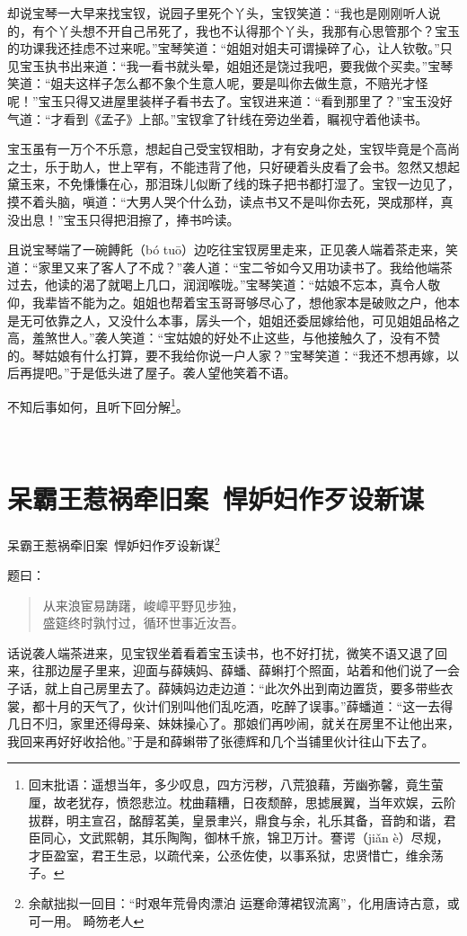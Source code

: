 \documentclass[12pt,oneside]{book}
\newenvironment{shici}{%
\begin{verse}%
\centering\large\hspace{12pt}}%
{\end{verse}}
\begin{document}
却说宝琴一大早来找宝钗，说园子里死个丫头，宝钗笑道：“我也是刚刚听人说的，有个丫头想不开自己吊死了，我也不认得那个丫头，我那有心思管那个？宝玉的功课我还挂虑不过来呢。”宝琴笑道：“姐姐对姐夫可谓操碎了心，让人钦敬。”只见宝玉执书出来道：“我一看书就头晕，姐姐还是饶过我吧，要我做个买卖。”宝琴笑道：“姐夫这样子怎么都不象个生意人呢，要是叫你去做生意，不赔光才怪呢！”宝玉只得又进屋里装样子看书去了。宝钗进来道：“看到那里了？”宝玉没好气道：“才看到《孟子》上部。”宝钗拿了针线在旁边坐着，瞩视守着他读书。

宝玉虽有一万个不乐意，想起自己受宝钗相助，才有安身之处，宝钗毕竟是个高尚之士，乐于助人，世上罕有，不能违背了他，只好硬着头皮看了会书。忽然又想起黛玉来，不免慊慊在心，那泪珠儿似断了线的珠子把书都打湿了。宝钗一边见了，摸不着头脑，嗔道：“大男人哭个什么劲，读点书又不是叫你去死，哭成那样，真没出息！”宝玉只得把泪擦了，捧书吟读。

且说宝琴端了一碗餺飥（bó tuō）边吃往宝钗房里走来，正见袭人端着茶走来，笑道：“家里又来了客人了不成？”袭人道：“宝二爷如今又用功读书了。我给他端茶过去，他读的渴了就喝上几口，润润喉咙。”宝琴笑道：“姑娘不忘本，真令人敬仰，我辈皆不能为之。姐姐也帮着宝玉哥哥够尽心了，想他家本是破败之户，他本是无可依靠之人，又没什么本事，孱头一个，姐姐还委屈嫁给他，可见姐姐品格之高，羞煞世人。”袭人笑道：“宝姑娘的好处不止这些，与他接触久了，没有不赞的。琴姑娘有什么打算，要不我给你说一户人家？”宝琴笑道：“我还不想再嫁，以后再提吧。”于是低头进了屋子。袭人望他笑着不语。

不知后事如何，且听下回分解\footnote{回末批语：遥想当年，多少叹息，四方污秽，八荒狼藉，芳幽弥馨，竟生萤厘，故老犹存，愤怨悲泣。枕曲藉糟，日夜颓醉，思摅展翼，当年欢娱，云阶拔群，明主宣召，酩醇茗美，皇景聿兴，鼎食与余，礼乐其备，音韵和谐，君臣同心，文武熙朝，其乐陶陶，御林千旅，锦卫万计。謇谔（jiǎn è）尽规，才臣盈室，君王生忌，以疏代亲，公丞佐使，以事系狱，忠贤惜亡，维余荡子。}。

 
\chapter{呆霸王惹祸牵旧案~悍妒妇作歹设新谋}
呆霸王惹祸牵旧案~悍妒妇作歹设新谋\footnote{余献拙拟一回目：“时艰年荒骨肉漂泊 运蹇命薄裙钗流离”，化用唐诗古意，或可一用。 畸笏老人}

题曰：

\begin{shici}
从来浪宦易踌躇，峻嶂平野见步独，\\
盛筵终时孰忖过，循环世事近汝吾。
\end{shici}

话说袭人端茶进来，见宝钗坐着看着宝玉读书，也不好打扰，微笑不语又退了回来，往那边屋子里来，迎面与薛姨妈、薛蟠、薛蝌打个照面，站着和他们说了一会子话，就上自己房里去了。薛姨妈边走边道：“此次外出到南边置货，要多带些衣裳，都十月的天气了，伙计们别叫他们乱吃酒，吃醉了误事。”薛蟠道：“这一去得几日不归，家里还得母亲、妹妹操心了。那娘们再吵闹，就关在房里不让他出来，我回来再好好收拾他。”于是和薛蝌带了张德辉和几个当铺里伙计往山下去了。
\end{document}
